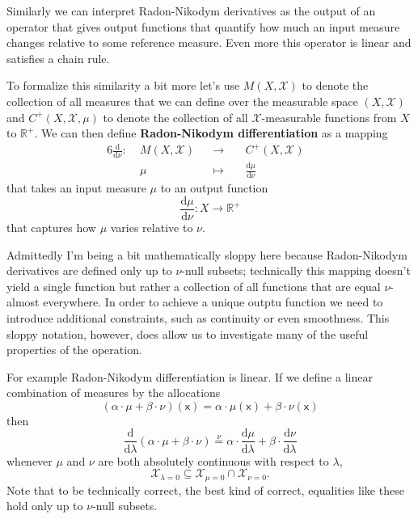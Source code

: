 \documentclass[
  letterpaper,
  DIV=11,
  numbers=noendperiod]{scrartcl}
\begin{document}
Similarly we can interpret Radon-Nikodym derivatives as the output of an
operator that gives output functions that quantify how much an input
measure changes relative to some reference measure. Even more this
operator is linear and satisfies a chain rule.

To formalize this similarity a bit more let's use \(M(X, \mathcal{X})\)
to denote the collection of all measures that we can define over the
measurable space \((X, \mathcal{X})\) and \(C^{+}(X, \mathcal{X}, \mu)\)
to denote the collection of all \(\mathcal{X}\)-measurable functions
from \(X\) to \(\mathbb{R}^{+}\). We can then define
\textbf{Radon-Nikodym differentiation} as a mapping \begin{alignat*}{6}
\frac{ \mathrm{d} }{ \mathrm{d} \nu } :\; & M(X, \mathcal{X}) & &\rightarrow& \;
& C^{+}(X, \mathcal{X}) &
\\
& \mu & &\mapsto& & \frac{ \mathrm{d} \mu }{ \mathrm{d} \nu } &
\end{alignat*} that takes an input measure \(\mu\) to an output function
\[
\frac{ \mathrm{d} \mu }{ \mathrm{d} \nu } : X \rightarrow \mathbb{R}^{+}
\] that captures how \(\mu\) varies relative to \(\nu\).

Admittedly I'm being a bit mathematically sloppy here because
Radon-Nikodym derivatives are defined only up to \(\nu\)-null subsets;
technically this mapping doesn't yield a single function but rather a
collection of all functions that are equal \(\nu\)-almost everywhere. In
order to achieve a unique outptu function we need to introduce
additional constraints, such as continuity or even smoothness. This
sloppy notation, however, does allow us to investigate many of the
useful properties of the operation.

For example Radon-Nikodym differentiation is linear. If we define a
linear combination of measures by the allocations \[
(\alpha \cdot \mu + \beta \cdot \nu)(\mathsf{x})
=
\alpha \cdot \mu(\mathsf{x}) + \beta \cdot \nu(\mathsf{x})
\] then \[
\frac{ \mathrm{d} }{ \mathrm{d} \lambda }
(\alpha \cdot \mu + \beta \cdot \nu)
\overset{\nu}{=}
\alpha \cdot \frac{ \mathrm{d} \mu}{ \mathrm{d} \lambda }
+ \beta \cdot \frac{ \mathrm{d} \nu }{ \mathrm{d} \lambda }
\] whenever \(\mu\) and \(\nu\) are both absolutely continuous with
respect to \(\lambda\), \[
\mathcal{X}_{\lambda = 0} \subseteq
\mathcal{X}_{\mu = 0} \cap \mathcal{X}_{\nu = 0}.
\] Note that to be technically correct, the best kind of correct,
equalities like these hold only up to \(\nu\)-null subsets.
\end{document}
